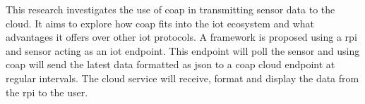 This research investigates the use of \gls{coap} in transmitting sensor data
to the cloud. It aims to explore how \gls{coap} fits into the \gls{iot} ecosystem and
what advantages it offers over other \gls{iot} protocols. A framework is proposed 
using a \gls{rpi} and sensor acting as an \gls{iot} endpoint. This endpoint will poll 
the sensor and using \gls{coap} will send the latest data formatted as \gls{json} to 
a \gls{coap} cloud endpoint at regular intervals.
The cloud service will receive, format and display the data from the \gls{rpi} 
to the user.
